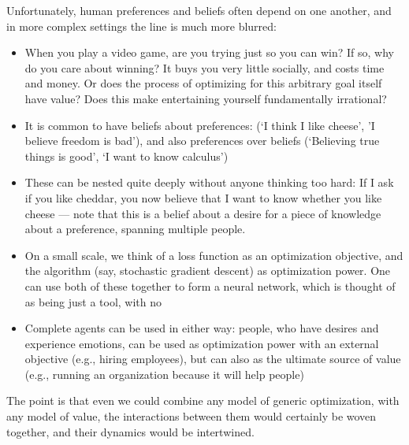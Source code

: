 \documentclass{article}
\begin{document}
	Unfortunately, human preferences and beliefs often depend on one another, and in more complex settings the line is much more blurred:
	\begin{itemize}[nosep]
		\item When you play a video game, are you trying just so you can win? If so, why do you care about winning? It buys you very little socially, and costs time and money. Or does the process of optimizing for this arbitrary goal itself have value? Does this make entertaining yourself fundamentally irrational?
		\item It is common to have beliefs about preferences: (`I think I like cheese', 'I believe freedom is bad'), and also preferences over beliefs (`Believing true things is good', `I want to know calculus')
		\item These can be nested quite deeply without anyone thinking too hard: If I ask if you like cheddar, you now believe that I want to know whether you like cheese --- note that this is a belief about a desire for a piece of knowledge about a preference, spanning multiple people.
		
		\item On a small scale, we think of a loss function as an optimization objective, and the algorithm (say, stochastic gradient descent) as optimization power. One can use both of these together to form a neural network, which is thought of as being just a tool, with no
		
		\item Complete agents can be used in either way: people, who have desires and experience emotions, can be used as optimization power with an external objective (e.g., hiring employees), but can also as the ultimate source of value (e.g., running an organization because it will help people)
	\end{itemize}
	The point is that even we could combine any model of generic optimization, with any model of value, the interactions between them would certainly be woven together, and their dynamics would be intertwined.
	
\end{document}
